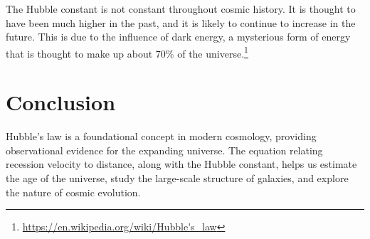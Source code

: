 \documentclass{article}
\begin{document}
The Hubble constant is not constant throughout cosmic history. It is thought to have been much higher in the past, and it is likely to continue to increase in the future. This is due to the influence of dark energy, a mysterious form of energy that is thought to make up about 70\% of the universe.\footnote{\url{https://en.wikipedia.org/wiki/Hubble's_law}}

\section{Conclusion}
Hubble's law is a foundational concept in modern cosmology, providing observational evidence for the expanding universe. The equation relating recession velocity to distance, along with the Hubble constant, helps us estimate the age of the universe, study the large-scale structure of galaxies, and explore the nature of cosmic evolution.
\end{document}
